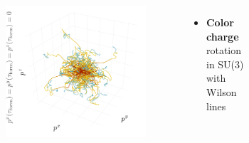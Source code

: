 \documentclass[aspectratio=169,11pt,usenames,dvipsnames]{beamer}
\begin{document}
\begin{frame}
\begin{columns}[onlytextwidth,t]
\begin{itemize}
            \end{itemize}
            \vspace{-20pt}
            \begin{figure}[!hbt]
                \centering
                \includegraphics[width=1.1\columnwidth]{images/wong_mom.png}
            \end{figure}
            \begin{itemize}\itemsep0em 
                \item \begin{center}\footnotesize {\bfseries Color charge} rotation in SU(3) with Wilson lines\end{center}
            \end{itemize}
            \vspace{-15pt}
            \begin{figure}[!hbt]
                \centering

\end{figure}
\end{columns}
\end{frame}
\end{document}
